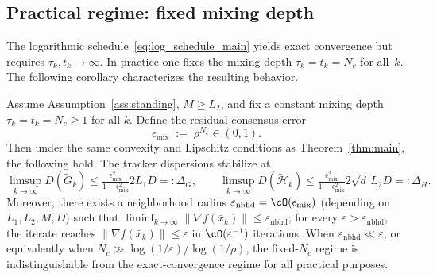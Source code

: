 \documentclass[review,onefignum,onetabnum]{siamart171218}
\begin{document}
\subsection{Practical regime: fixed mixing depth}\label{ssec:fixed_nc}

The logarithmic schedule~\eqref{eq:log_schedule_main} yields exact
convergence but requires $\tau_k,t_k\to\infty$.
In practice one fixes the mixing depth $\tau_k=t_k=N_c$ for all~$k$.
The following corollary characterizes the resulting behavior.

\begin{corollary}\label{cor:fixed_nc}
Assume Assumption~\ref{ass:standing}, $M\ge L_2$, and fix a constant mixing depth $\tau_k=t_k=N_c\ge 1$ for all $k$.
Define the residual consensus error
\[
\epsilon_{\mathrm{mix}} \;:=\; \rho^{N_c}\in(0,1).
\]
Then under the same convexity and Lipschitz conditions as Theorem~\ref{thm:main},
the following hold.
The tracker dispersions stabilize at
\[
	\limsup_{k\to\infty} D(\tilde G_k)
	\le \tfrac{\epsilon_{\mathrm{mix}}^2}{1-\epsilon_{\mathrm{mix}}^2}2L_1D
	=: \bar\Delta_G,
	\qquad
	\limsup_{k\to\infty} D(\tilde{\mathcal H}_k)
	\le \tfrac{\epsilon_{\mathrm{mix}}^2}{1-\epsilon_{\mathrm{mix}}^2}2\sqrt{d}\,L_2D
	=: \bar\Delta_H.
\]
Moreover, there exists a neighborhood radius $\varepsilon_{\mathrm{nbhd}}=\cO(\epsilon_{\mathrm{mix}})$
(depending on $L_1,L_2,M,D$) such that
$\liminf_{k\to\infty}\|\nabla f(\bar x_k)\|\le \varepsilon_{\mathrm{nbhd}}$;
for every $\varepsilon>\varepsilon_{\mathrm{nbhd}}$, the iterate reaches
$\|\nabla f(\bar x_k)\|\le \varepsilon$ in $\cO(\varepsilon^{-1})$ iterations.
When $\varepsilon_{\mathrm{nbhd}}\ll\varepsilon$,
or equivalently when $N_c\gg \log(1/\varepsilon)/\log(1/\rho)$,
the fixed-$N_c$ regime is indistinguishable from the exact-convergence regime
for all practical purposes.
\end{corollary}
\end{document}
